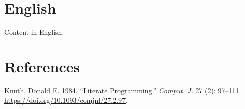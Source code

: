 \documentclass[
  letterpaper,
  DIV=11,
  numbers=noendperiod]{scrreprt}
\newlength{\cslhangindent}
\newenvironment{CSLReferences}[2] %
 {\begin{list}{}{%
  \setlength{\itemindent}{0pt}
  \setlength{\leftmargin}{0pt}
  \setlength{\parsep}{0pt}
  \ifodd #1
   \setlength{\leftmargin}{\cslhangindent}
   \setlength{\itemindent}{-1\cslhangindent}
  \fi
  \setlength{\itemsep}{#2\baselineskip}}}
 {\end{list}}
\begin{document}

\chapter{English}\label{english}

Content in English.


\chapter*{References}\label{references}


\label{refs}
\begin{CSLReferences}{1}{0}
Knuth, Donald E. 1984. {``Literate Programming.''} \emph{Comput. J.} 27
(2): 97--111. \url{https://doi.org/10.1093/comjnl/27.2.97}.

\end{CSLReferences}
\end{document}
